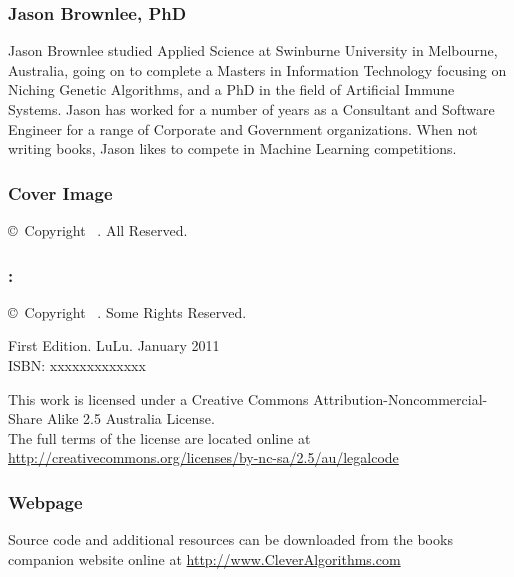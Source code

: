

\vspace*{\fill}
\begin{flushleft}
\begin{small}

\subsubsection*{Jason Brownlee, PhD}
Jason Brownlee studied Applied Science at Swinburne University in Melbourne, Australia, going on to complete a Masters in Information Technology focusing on Niching Genetic Algorithms, and a PhD in the field of Artificial Immune Systems. Jason has worked for a number of years as a Consultant and Software Engineer for a range of Corporate and Government organizations. When not writing books, Jason likes to compete in Machine Learning competitions.

\subsubsection*{Cover Image}
\copyright\ Copyright \mybookdate\ \mybookauthor. All Reserved. \\
\vspace{0.5cm}

\subsubsection*{\mybooktitle: \mybooksubtitle}
\copyright\ Copyright \mybookdate\ \mybookauthor. Some Rights Reserved. \\
\vspace{0.5cm}

First Edition. LuLu. January 2011 \\
ISBN: xxxxxxxxxxxxx \\
\vspace{0.5cm}

This work is licensed under a Creative Commons Attribution\--Noncommercial\--Share Alike 2.5 Australia License. \\
The full terms of the license are located online at \url{http://creativecommons.org/licenses/by-nc-sa/2.5/au/legalcode} \\
\vspace{0.5cm}

\subsubsection*{Webpage}
Source code and additional resources can be downloaded from the books companion website online at \url{http://www.CleverAlgorithms.com}

\end{small}
\end{flushleft}

